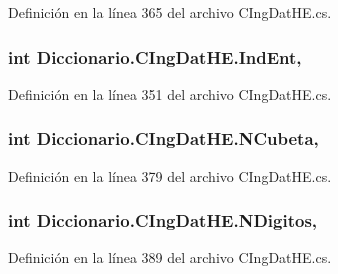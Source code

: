 Definición en la línea 365 del archivo C\-Ing\-Dat\-H\-E.\-cs.

\hypertarget{class_diccionario_1_1_c_ing_dat_h_e_add3ac954600ec9649692b4873e08197b}{
\subsubsection[{Ind\-Ent}]{\setlength{\rightskip}{0pt plus 5cm}int Diccionario.\-C\-Ing\-Dat\-H\-E.\-Ind\-Ent\hspace{0.3cm}{\ttfamily [get]}, {\ttfamily [set]}}}\label{class_diccionario_1_1_c_ing_dat_h_e_add3ac954600ec9649692b4873e08197b}


Definición en la línea 351 del archivo C\-Ing\-Dat\-H\-E.\-cs.

\hypertarget{class_diccionario_1_1_c_ing_dat_h_e_ab65a1a899ee3b50f48be4a82666b0fec}{
\subsubsection[{N\-Cubeta}]{\setlength{\rightskip}{0pt plus 5cm}int Diccionario.\-C\-Ing\-Dat\-H\-E.\-N\-Cubeta\hspace{0.3cm}{\ttfamily [get]}, {\ttfamily [set]}}}\label{class_diccionario_1_1_c_ing_dat_h_e_ab65a1a899ee3b50f48be4a82666b0fec}


Definición en la línea 379 del archivo C\-Ing\-Dat\-H\-E.\-cs.

\hypertarget{class_diccionario_1_1_c_ing_dat_h_e_af9f1402b6cba6ed823ea1bbc9d8c2471}{
\subsubsection[{N\-Digitos}]{\setlength{\rightskip}{0pt plus 5cm}int Diccionario.\-C\-Ing\-Dat\-H\-E.\-N\-Digitos\hspace{0.3cm}{\ttfamily [get]}, {\ttfamily [set]}}}\label{class_diccionario_1_1_c_ing_dat_h_e_af9f1402b6cba6ed823ea1bbc9d8c2471}


Definición en la línea 389 del archivo C\-Ing\-Dat\-H\-E.\-cs.

